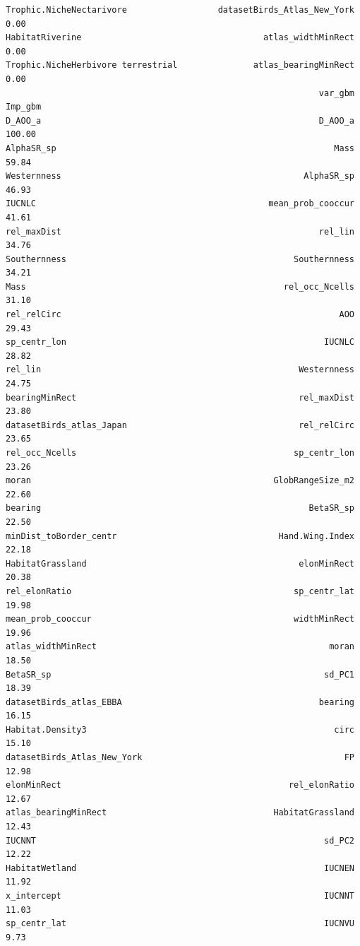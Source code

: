 \documentclass[
  letterpaper,
  DIV=11,
  numbers=noendperiod]{scrreprt}
\begin{document}
\begin{verbatim}
Trophic.NicheNectarivore                  datasetBirds_Atlas_New_York    0.00
HabitatRiverine                                    atlas_widthMinRect    0.00
Trophic.NicheHerbivore terrestrial               atlas_bearingMinRect    0.00
                                                              var_gbm Imp_gbm
D_AOO_a                                                       D_AOO_a  100.00
AlphaSR_sp                                                       Mass   59.84
Westernness                                                AlphaSR_sp   46.93
IUCNLC                                              mean_prob_cooccur   41.61
rel_maxDist                                                   rel_lin   34.76
Southernness                                             Southernness   34.21
Mass                                                   rel_occ_Ncells   31.10
rel_relCirc                                                       AOO   29.43
sp_centr_lon                                                   IUCNLC   28.82
rel_lin                                                   Westernness   24.75
bearingMinRect                                            rel_maxDist   23.80
datasetBirds_atlas_Japan                                  rel_relCirc   23.65
rel_occ_Ncells                                           sp_centr_lon   23.26
moran                                                GlobRangeSize_m2   22.60
bearing                                                     BetaSR_sp   22.50
minDist_toBorder_centr                                Hand.Wing.Index   22.18
HabitatGrassland                                          elonMinRect   20.38
rel_elonRatio                                            sp_centr_lat   19.98
mean_prob_cooccur                                        widthMinRect   19.96
atlas_widthMinRect                                              moran   18.50
BetaSR_sp                                                      sd_PC1   18.39
datasetBirds_atlas_EBBA                                       bearing   16.15
Habitat.Density3                                                 circ   15.10
datasetBirds_Atlas_New_York                                        FP   12.98
elonMinRect                                             rel_elonRatio   12.67
atlas_bearingMinRect                                 HabitatGrassland   12.43
IUCNNT                                                         sd_PC2   12.22
HabitatWetland                                                 IUCNEN   11.92
x_intercept                                                    IUCNNT   11.03
sp_centr_lat                                                   IUCNVU    9.73

\end{verbatim}
\end{document}
